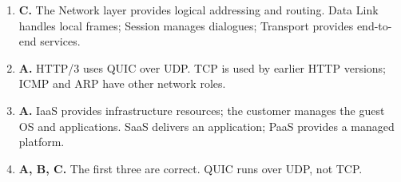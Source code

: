 \begin{enumerate}[label=\textbf{Q\arabic*.}, leftmargin=*]
\item \textbf{C.} The Network layer provides logical addressing and routing. Data Link handles local frames; Session manages dialogues; Transport provides end-to-end services.

\item \textbf{A.} HTTP/3 uses QUIC over UDP. TCP is used by earlier HTTP versions; ICMP and ARP have other network roles.

\item \textbf{A.} IaaS provides infrastructure resources; the customer manages the guest OS and applications. SaaS delivers an application; PaaS provides a managed platform.

\item \textbf{A, B, C.} The first three are correct. QUIC runs over UDP, not TCP.

\end{enumerate}
